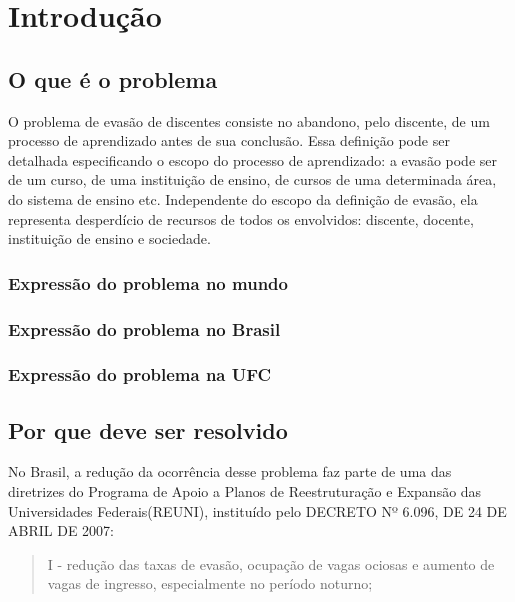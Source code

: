 \chapter{Introdução}

\section{O que é o problema}

O problema de evasão de discentes consiste no abandono, pelo discente, de um processo de aprendizado antes de sua conclusão. Essa definição pode ser detalhada especificando o escopo do processo de aprendizado: a evasão pode ser de um curso, de uma instituição de ensino, de cursos de uma determinada área, do sistema de ensino etc. Independente do escopo da definição de evasão, ela representa desperdício de recursos de todos os envolvidos: discente, docente, instituição de ensino e sociedade.

\subsection{Expressão do problema no mundo}
\subsection{Expressão do problema no Brasil}
\subsection{Expressão do problema na UFC}

\section{Por que deve ser resolvido}

No Brasil, a redução da ocorrência desse problema faz parte de uma das diretrizes do Programa de Apoio a Planos de Reestruturação e Expansão das Universidades Federais(REUNI), instituído pelo DECRETO Nº 6.096, DE 24 DE ABRIL DE 2007:

\begin{quote}
I - redução das taxas de evasão, ocupação de vagas ociosas e aumento de vagas de ingresso, especialmente no período noturno;
\end{quote}

